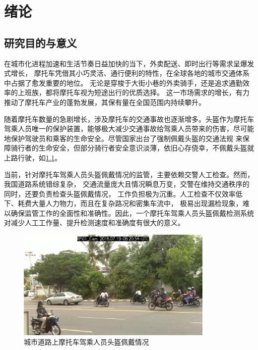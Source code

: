 
\chapter{绪论}

\section{研究目的与意义}

在城市化进程加速和生活节奏日益加快的当下，外卖配送、即时出行等需求呈爆发式增长，
摩托车凭借其小巧灵活、通行便利的特性，在全球各地的城市交通体系中占据了愈发重要的地位。
无论是穿梭于大街小巷的外卖骑手，还是追求通勤效率的上班族，都将摩托车视为短途出行的优质选择。
这一市场需求的增长，有力推动了摩托车产业的蓬勃发展，其保有量在全国范围内持续攀升。

随着摩托车数量的急剧增长，涉及摩托车的交通事故也逐渐增多。头盔作为摩托车驾乘人员唯一的保护装置，能够极大减少交通事故给驾乘人员带来的伤害，尽可能地保护驾驶员和乘客的生命安全\cite{hss}。尽管国家出台了强制佩戴头盔的交通法规
来保障骑行者的生命安全，但部分骑行者安全意识淡薄，依旧心存侥幸，不佩戴头盔就上路行驶，如\ref{fig:traffic}。

当前，针对摩托车驾乘人员头盔佩戴情况的监管，主要依赖交警人工检查。然而，我国道路系统错综复杂，
交通流量庞大且情况瞬息万变，交警在维持交通秩序的同时，还要负责检查头盔佩戴情况，
工作负担极为沉重。人工检查不仅效率低下、耗费大量人力物力，而且在复杂路况和密集车流中，
极易出现漏检现象，难以确保监管工作的全面性和准确性。因此，一个摩托车驾乘人员头盔佩戴检测系统对减少人工工作量、提升检测速度和准确度有很大的意义。

\begin{figure}[!htb]
  \centering
  \includegraphics[width=0.85\textwidth]{figs/chap01/traffic}
  \caption{城市道路上摩托车驾乘人员头盔佩戴情况}
  \label{fig:traffic}
\end{figure}
